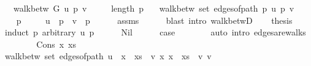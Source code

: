 \begin{isabellebody}
\ \ \ {\isachardoublequoteopen}walk{\isacharunderscore}{\kern0pt}betw\ G\ u\ p\ v{\isachardoublequoteclose}\isanewline
\ \ \ {\isachardoublequoteopen}{}\ {\isasymle}\ length\ p{\isachardoublequoteclose}\isanewline
\ \ \ {\isachardoublequoteopen}walk{\isacharunderscore}{\kern0pt}betw\ {\isacharparenleft}{\kern0pt}set\ {\isacharparenleft}{\kern0pt}edges{\isacharunderscore}{\kern0pt}of{\isacharunderscore}{\kern0pt}path\ p{\isacharparenright}{\kern0pt}{\isacharparenright}{\kern0pt}\ u\ p\ v{\isachardoublequoteclose}%
\endisataginvisible
{\isafoldinvisible}%
%
\isadeliminvisible
\isanewline
%
\endisadeliminvisible
%
\isadelimproof
%
\endisadelimproof
%
\isatagproof
{}\isamarkupfalse%
\ {\isacharminus}{\kern0pt}\isanewline
\ \ \isamarkupfalse%
\ p{\isacharprime}{\kern0pt}\ \isanewline
\ \ \ \ {\isachardoublequoteopen}u\ {\isacharhash}{\kern0pt}\ p{\isacharprime}{\kern0pt}\ {\isacharat}{\kern0pt}\ {\isacharbrackleft}{\kern0pt}v{\isacharbrackright}{\kern0pt}\ {\isacharequal}{\kern0pt}\ p{\isachardoublequoteclose}\isanewline
\ \ \ \ \isamarkupfalse%
\ assms\isanewline
\ \ \ \ \isamarkupfalse%
\ {\isacharparenleft}{\kern0pt}blast\ intro{\isacharcolon}{\kern0pt}\ walk{\isacharunderscore}{\kern0pt}betwD{\isacharunderscore}{\kern0pt}{}{\isacharparenright}{\kern0pt}\isanewline
\ \ \isamarkupfalse%
\ {\isacharquery}{\kern0pt}thesis\isanewline
\ \ \isamarkupfalse%
\ {\isacharparenleft}{\kern0pt}induct\ p{\isacharprime}{\kern0pt}\ arbitrary{\isacharcolon}{\kern0pt}\ u\ p{\isacharparenright}{\kern0pt}\isanewline
\ \ \ \ \isamarkupfalse%
\ Nil\isanewline
\ \ \ \ \isamarkupfalse%
\ {\isacharquery}{\kern0pt}case\isanewline
\ \ \ \ \ \ \isamarkupfalse%
\ {\isacharparenleft}{\kern0pt}auto\ intro{\isacharcolon}{\kern0pt}\ edges{\isacharunderscore}{\kern0pt}are{\isacharunderscore}{\kern0pt}walks{\isacharparenright}{\kern0pt}\isanewline
\ \ \isamarkupfalse%
\isanewline
\ \ \ \ \isamarkupfalse%
\ {\isacharparenleft}{\kern0pt}Cons\ x\ xs{\isacharparenright}{\kern0pt}\isanewline
\ \ \ \ \isamarkupfalse%
\ {\isachardoublequoteopen}walk{\isacharunderscore}{\kern0pt}betw\ {\isacharparenleft}{\kern0pt}set\ {\isacharparenleft}{\kern0pt}edges{\isacharunderscore}{\kern0pt}of{\isacharunderscore}{\kern0pt}path\ {\isacharparenleft}{\kern0pt}u\ {\isacharhash}{\kern0pt}\ x\ {\isacharhash}{\kern0pt}\ xs\ {\isacharat}{\kern0pt}\ {\isacharbrackleft}{\kern0pt}v{\isacharbrackright}{\kern0pt}{\isacharparenright}{\kern0pt}{\isacharparenright}{\kern0pt}{\isacharparenright}{\kern0pt}\ x\ {\isacharparenleft}{\kern0pt}x\ {\isacharhash}{\kern0pt}\ xs\ {\isacharat}{\kern0pt}\ {\isacharbrackleft}{\kern0pt}v{\isacharbrackright}{\kern0pt}{\isacharparenright}{\kern0pt}\ v{\isachardoublequoteclose}\isanewline

\end{isabellebody}
